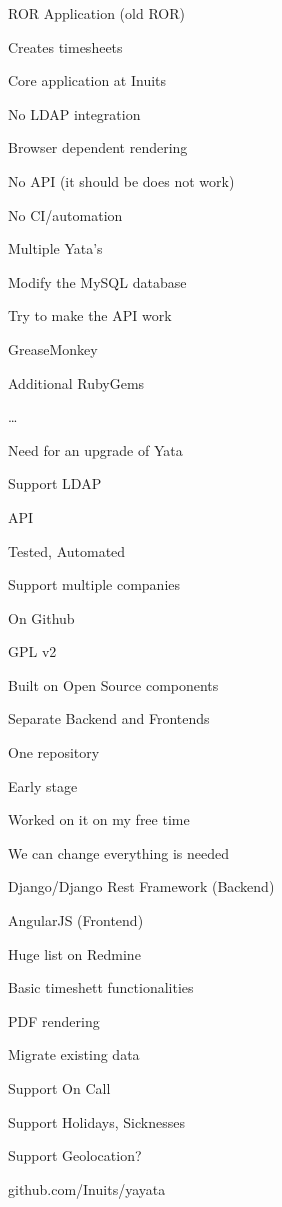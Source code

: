 \titleSlide


\inuitsSlide


\begin{iframe}[Yata]
\item ROR Application (old ROR)
\item Creates timesheets
\item Core application at Inuits
\end{iframe}
\begin{iframe}
\item No LDAP integration
\item Browser dependent rendering
\item No API (it should be does not work)
\item No CI/automation
\item Multiple Yata's
\end{iframe}
\begin{iframe}
\item Modify the MySQL database
\item Try to make the API work
\item GreaseMonkey
\item Additional RubyGems
\item \dots
\end{iframe}
\begin{iframe}[YaYaTa]
\item Need for an upgrade of Yata
\item Support LDAP
\item API
\item Tested, Automated
\item Support multiple companies
\end{iframe}
\begin{iframe}
\item On Github
\item GPL v2
\item Built on Open Source components
\item Separate Backend and Frontends
\item One repository
\end{iframe}
\begin{iframe}
\item Early stage
\item Worked on it on my free time
\item We can change everything is needed
\end{iframe}
\begin{iframe}[Technologies]
\item Django/Django Rest Framework (Backend)
\item AngularJS (Frontend)
\end{iframe}
\begin{iframe}[TODO]
\item Huge list on Redmine
\item Basic timeshett functionalities
\item PDF rendering
\item Migrate existing data
\item Support On Call
\item Support Holidays, Sicknesses
\item Support Geolocation?
\end{iframe}
\begin{centerSlide}github.com/Inuits/yayata\end{centerSlide}
